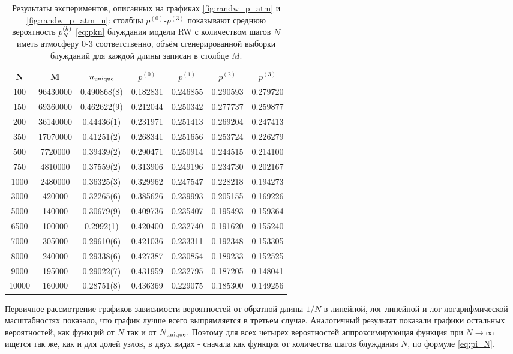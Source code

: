 \begin{table}[h] 
\centering
\begin{tabular}{|c|c|c|c|c|c|c|}
\hline
N & M & $ n_{\textup{unique}} $ & $p^{(0)}$ & $p^{(1)}$ & $p^{(2)}$ & $p^{(3)}$ \\ \hline
100 & 96430000 & 0.490868(8) & 0.182831 & 0.246855 & 0.290593 & 0.279720 \\ \hline
150 & 69360000 & 0.462622(9) & 0.212044 & 0.250342 &0.277737 &0.259877 \\ \hline
200 & 36140000 & 0.44436(1) & 0.231971 & 0.251413 & 0.269204 & 0.247413 \\ \hline
350 & 17070000 & 0.41251(2) & 0.268341 & 0.251656 &0.253724 & 0.226279 \\ \hline
500 & 7720000 & 0.39439(2) & 0.290471 & 0.250914 & 0.244515 & 0.214100 \\ \hline
750 & 4810000 & 0.37559(2) & 0.313906 & 0.249196 & 0.234730 & 0.202167 \\ \hline 
1000 & 2480000 & 0.36325(3) & 0.329962 & 0.247547 & 0.228218 & 0.194273 \\ \hline
3000 & 420000 & 0.32265(6) & 0.385626 & 0.239993& 0.205155 & 0.169226 \\ \hline
5000 & 140000 & 0.30679(9) & 0.409736 & 0.235407 & 0.195493 & 0.159364  \\ \hline
6500 & 100000 & 0.2992(1) & 0.420400 & 0.232740 & 0.191620 & 0.155240 \\ \hline
7000 & 305000 & 0.29610(6) & 0.421036 & 0.233311 & 0.192348 & 0.153305  \\ \hline
8000 & 240000 & 0.29338(6) & 0.427387 & 0.230854 & 0.189233 & 0.152525 \\ \hline
9000 & 195000 & 0.29022(7) & 0.431959 & 0.232795 & 0.187205 & 0.148041 \\ \hline
10000 & 160000 & 0.28751(8) & 0.436369 & 0.229075 & 0.185300 & 0.149256 \\ \hline
\end{tabular}
\caption{Результаты экспериментов, описанных на графиках \ref{fig:randw_p_atm} и \ref{fig:randw_p_atm_u}: столбцы $p^{(0)}$-$p^{(3)}$ показывают среднюю вероятность $p^{(k)}_N$ \eqref{eq:pkn} блуждания модели RW с количеством шагов $N$ иметь атмосферу 0-3 соответственно, объём сгенерированной выборки блужданий для каждой длины записан в столбце $M$.}
\label{tab:randw_p_atm}
\end{table}

Первичное рассмотрение графиков зависимости вероятностей от обратной длины $1/N$ в линейной, лог-линейной и лог-логарифмической масштабностях показало, что график лучше всего выпрямляется в третьем случае. 
Аналогичный результат показали графики остальных вероятностей, как функций от $N$ так и от $N_{\textup{unique}}$.
Поэтому для всех четырех вероятностей аппроксимирующая функция при $N \to \infty$ ищется так же, как и для долей узлов, в двух видах - сначала как функция от количества шагов блуждания $N$, по формуле \eqref{eq:pi_N}.

